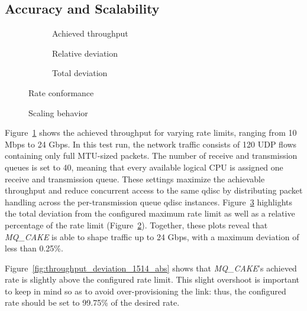 \subsection{Accuracy and Scalability}
\begin{figure*}
    \begin{subfigure}{0.3\linewidth}
        \centering
        
        \caption{Achieved throughput}\label{fig:tp_rate_conformance}
    \end{subfigure}
    \hfill
    \begin{subfigure}{0.3\linewidth}
        \centering
        
        \caption{Relative deviation}\label{fig:tp_deviation_perc}
    \end{subfigure}
    \hfill
    \begin{subfigure}{0.3\linewidth}
        \centering
        
        \caption{Total deviation}\label{fig:tp_deviation_total}
    \end{subfigure}
    \caption{Rate conformance}\label{fig:accuracy}
\end{figure*}
\begin{figure}
    \centering
    
    \caption{Scaling behavior}\label{fig:scaling}
\end{figure}
Figure~\ref{fig:tp_rate_conformance} shows the achieved throughput for varying rate limits, ranging from 10 Mbps to 24 Gbps.
%
In this test run, the network traffic consists of 120 UDP flows containing only full MTU-sized packets.
%
The number of receive and transmission queues is set to 40, meaning that every available logical CPU is assigned one receive and transmission queue.
%
These settings maximize the achievable throughput and reduce concurrent access to the same qdisc by distributing packet handling across the per-transmission queue qdisc instances.
%
Figure~\ref{fig:tp_deviation_total} highlights the total deviation from the configured maximum rate limit as well as a relative percentage of the rate limit (Figure~\ref{fig:tp_deviation_perc}).
%
Together, these plots reveal that \textit{MQ\_CAKE} is able to shape traffic up to 24 Gbps, with a maximum deviation of less than 0.25\%.

Figure~\ref{fig:throughput_deviation_1514_abs} shows that  \textit{MQ\_CAKE}'s achieved rate is slightly above the configured rate limit.
%
This slight overshoot is important to keep in mind so as to avoid over-provisioning the link: thus, the configured rate should be set to 99.75\% of the desired rate.
%

